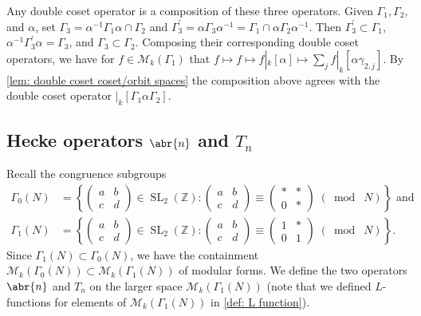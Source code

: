 \documentclass[10pt,leqno,twoside]{article}
\theoremstyle{plain}
\theoremstyle{definition}
\numberwithin{equation}{section}
\numberwithin{lem}{section}
\newcommand{\cbr}[1]{\left\{#1\right\}}
\DeclareMathOperator{\SL}{SL}
\newcommand{\smod}[1]{\;(\bmod\; #1)}
\newcommand{\abcd}{\begin{pmatrix}
    a & b \\ c & d
\end{pmatrix}}
\newcommand{\slz}{\SL_2(\mathbb{Z})}
\begin{document}
Any double coset operator is a composition of these three operators. Given $\varGamma_1,\varGamma_2$, and $\alpha$, set $\varGamma_3 = \alpha^{-1}\varGamma_1\alpha \cap \varGamma_2$ and $\varGamma_3^\prime = \alpha\varGamma_3\alpha^{-1} = \varGamma_1\cap \alpha\varGamma_2\alpha^{-1}$. Then $\varGamma_3^\prime\subset \varGamma_1$, $\alpha^{-1}\varGamma_3^\prime\alpha = \varGamma_3$, and $\varGamma_3\subset \varGamma_2$. Composing their corresponding double coset operators, we have for  $f\in\mathcal M_k(\varGamma_1)$ that $f\mapsto f\mapsto f|_k[\alpha]\mapsto \sum_j f|_k[\alpha\gamma_{2,j}]$. By \cref{lem: double coset coset/orbit spaces} the composition above agrees with the double coset operator $|_k[\varGamma_1\alpha\varGamma_2]$.
\subsection{Hecke operators $\abr{n}$ and $T_n$}
Recall the congruence subgroups \begin{align*}
    \varGamma_0(N) &= \cbr{\abcd\in\slz: \abcd\equiv\begin{pmatrix}
        \ast & \ast \\ 0 & \ast
    \end{pmatrix}\smod N}\text{ and}\\
    \varGamma_1(N) &= \cbr{\abcd\in \slz: \begin{pmatrix}
        a & b \\ c & d 
    \end{pmatrix}\equiv \begin{pmatrix}
        1 & \ast \\ 0 & 1
    \end{pmatrix}\smod N}.
\end{align*} Since $\varGamma_1(N)\subset 
\varGamma_0(N)$, we have the containment $\mathcal M_k(\varGamma_0(N))\subset \mathcal M_k(\varGamma_1(N))$ of modular forms. We define the two operators $\abr{n}$ and $T_n$ on the larger space $\mathcal M_k(\varGamma_1(N))$ (note that we defined $L$-functions for elements of $\mathcal M_k(\varGamma_1(N))$ in \cref{def: L function}).
\end{document}
